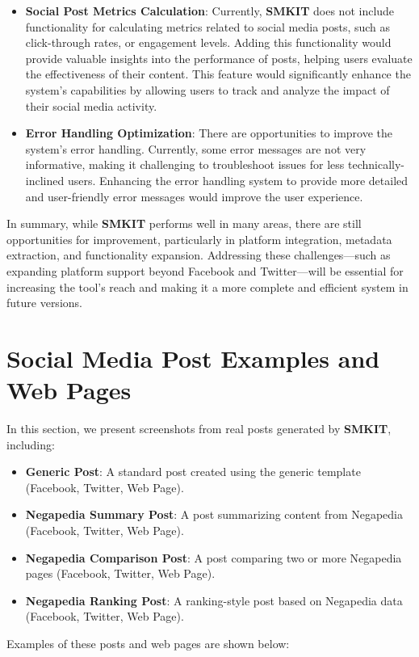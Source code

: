 \begin{itemize}
    \item \textbf{Social Post Metrics Calculation}: 
    Currently, \textbf{SMKIT} does not include functionality for calculating metrics related to social media posts, such as click-through rates, or engagement levels. Adding this functionality would provide valuable insights into the performance of posts, helping users evaluate the effectiveness of their content. This feature would significantly enhance the system's capabilities by allowing users to track and analyze the impact of their social media activity.
    
    \item \textbf{Error Handling Optimization}: There are opportunities to improve the system’s error handling. Currently, some error messages are not very informative, making it challenging to troubleshoot issues for less technically-inclined users. Enhancing the error handling system to provide more detailed and user-friendly error messages would improve the user experience.
\end{itemize}

In summary, while \textbf{SMKIT} performs well in many areas, there are still opportunities for improvement, particularly in platform integration, metadata extraction, and functionality expansion. Addressing these challenges—such as expanding platform support beyond Facebook and Twitter—will be essential for increasing the tool's reach and making it a more complete and efficient system in future versions.


\section{Social Media Post Examples and Web Pages}
\label{sec:social_media_post_examples}
In this section, we present screenshots from real posts generated by \textbf{SMKIT}, including:
\begin{itemize}
    \item \textbf{Generic Post}: A standard post created using the generic template (Facebook, Twitter, Web Page).
    \item \textbf{Negapedia Summary Post}: A post summarizing content from Negapedia (Facebook, Twitter, Web Page).
    \item \textbf{Negapedia Comparison Post}: A post comparing two or more Negapedia pages (Facebook, Twitter, Web Page).
    \item \textbf{Negapedia Ranking Post}: A ranking-style post based on Negapedia data (Facebook, Twitter, Web Page).
\end{itemize}
Examples of these posts and web pages are shown below:


